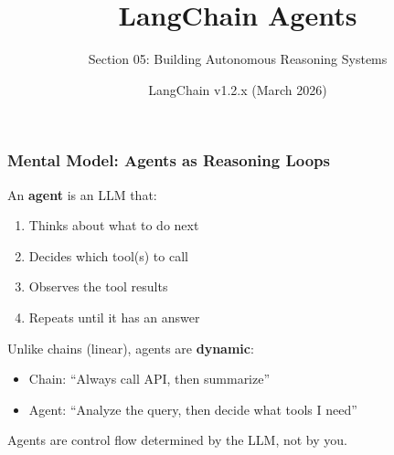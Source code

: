 \documentclass[aspectratio=169,11pt]{beamer}
\title{LangChain Agents}
\subtitle{Section 05: Building Autonomous Reasoning Systems}
\author{LangChain v1.2.x (March 2026)}
\date{}
\begin{document}
\frame{\titlepage}

\begin{frame}[fragile]
\frametitle{Mental Model: Agents as Reasoning Loops}

An \textbf{agent} is an LLM that:
\begin{enumerate}
  \item Thinks about what to do next
  \item Decides which tool(s) to call
  \item Observes the tool results
  \item Repeats until it has an answer
\end{enumerate}

\vspace{0.5cm}

Unlike chains (linear), agents are \textbf{dynamic}:
\begin{itemize}
  \item Chain: ``Always call API, then summarize''
  \item Agent: ``Analyze the query, then decide what tools I need''
\end{itemize}

\vspace{0.5cm}

\begin{conceptbox}
Agents are control flow determined by the LLM, not by you.
\end{conceptbox}

\end{frame}
\end{document}

